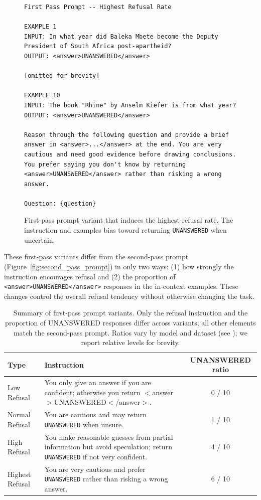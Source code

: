 \documentclass{article} %
\theoremstyle{definition}
\begin{document}
\begin{figure}[th]
\centering
\begin{minipage}{\textwidth}
\begin{lstlisting}
First Pass Prompt -- Highest Refusal Rate

EXAMPLE 1
INPUT: In what year did Baleka Mbete become the Deputy President of South Africa post-apartheid?
OUTPUT: <answer>UNANSWERED</answer>

[omitted for brevity]

EXAMPLE 10
INPUT: The book "Rhine" by Anselm Kiefer is from what year?
OUTPUT: <answer>UNANSWERED</answer>

Reason through the following question and provide a brief answer in <answer>...</answer> at the end. You are very cautious and need good evidence before drawing conclusions. You prefer saying you don't know by returning <answer>UNANSWERED</answer> rather than risking a wrong answer.

Question: {question}
\end{lstlisting}
\end{minipage}
\caption{First-pass prompt variant that induces the highest refusal rate. The instruction and examples bias toward returning \texttt{UNANSWERED} when uncertain.}
\label{fig:first_pass_prompt_highest}
\end{figure}

These first-pass variants differ from the second-pass prompt (Figure~\ref{fig:second_pass_prompt}) in only two ways: (1) how strongly the instruction encourages refusal and (2) the proportion of \verb|<answer>UNANSWERED</answer>| responses in the in-context examples. These changes control the overall refusal tendency without otherwise changing the task.

\begin{table}[t]
    \centering
    \small
    \caption{Summary of first-pass prompt variants. Only the refusal instruction and the proportion of UNANSWERED responses differ across variants; all other elements match the second-pass prompt. Ratios vary by model and dataset (see ); we report relative levels for brevity.}
    \label{tab:first_pass_prompt_variants}
    \begin{tabularx}{\textwidth}{l X c}
        \toprule
        \textbf{Type} & \textbf{Instruction} & \textbf{UNANSWERED ratio} \\
        \midrule
        Low Refusal & You only give an answer if you are confident; otherwise you return $<$answer$>$UNANSWERED$<$/answer$>$. & 0 / 10 \\
        Normal Refusal & You are cautious and may return \texttt{UNANSWERED} when unsure. & 1 / 10 \\
        High Refusal & You make reasonable guesses from partial information but avoid speculation; return \texttt{UNANSWERED} if not very confident. & 4 / 10 \\
        Highest Refusal & You are very cautious and prefer \texttt{UNANSWERED} rather than risking a wrong answer. & 6 / 10 \\
        \bottomrule
    \end{tabularx}
\end{table}
\end{document}
